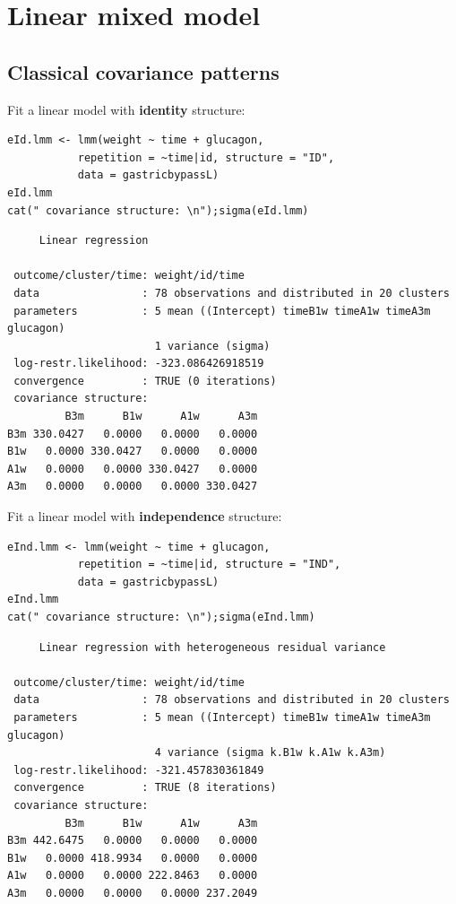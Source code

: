 \documentclass[12pt]{article}
\begin{document}
\clearpage

\section{Linear mixed model}
\label{sec:org724ba8b}
\subsection{Classical covariance patterns}
\label{sec:org7bb6bec}
Fit a linear model with \textbf{identity} structure:
\lstset{language=r,label= ,caption= ,captionpos=b,numbers=none}
\begin{lstlisting}
eId.lmm <- lmm(weight ~ time + glucagon,
	       repetition = ~time|id, structure = "ID",
	       data = gastricbypassL)
eId.lmm
cat(" covariance structure: \n");sigma(eId.lmm)
\end{lstlisting}

\begin{verbatim}
     Linear regression 

 outcome/cluster/time: weight/id/time 
 data                : 78 observations and distributed in 20 clusters 
 parameters          : 5 mean ((Intercept) timeB1w timeA1w timeA3m glucagon) 
                       1 variance (sigma) 
 log-restr.likelihood: -323.086426918519 
 convergence         : TRUE (0 iterations)
 covariance structure: 
         B3m      B1w      A1w      A3m
B3m 330.0427   0.0000   0.0000   0.0000
B1w   0.0000 330.0427   0.0000   0.0000
A1w   0.0000   0.0000 330.0427   0.0000
A3m   0.0000   0.0000   0.0000 330.0427
\end{verbatim}

Fit a linear model with \textbf{independence} structure:
\lstset{language=r,label= ,caption= ,captionpos=b,numbers=none}
\begin{lstlisting}
eInd.lmm <- lmm(weight ~ time + glucagon,
	       repetition = ~time|id, structure = "IND",
	       data = gastricbypassL)
eInd.lmm
cat(" covariance structure: \n");sigma(eInd.lmm)
\end{lstlisting}

\begin{verbatim}
     Linear regression with heterogeneous residual variance 

 outcome/cluster/time: weight/id/time 
 data                : 78 observations and distributed in 20 clusters 
 parameters          : 5 mean ((Intercept) timeB1w timeA1w timeA3m glucagon) 
                       4 variance (sigma k.B1w k.A1w k.A3m) 
 log-restr.likelihood: -321.457830361849 
 convergence         : TRUE (8 iterations)
 covariance structure: 
         B3m      B1w      A1w      A3m
B3m 442.6475   0.0000   0.0000   0.0000
B1w   0.0000 418.9934   0.0000   0.0000
A1w   0.0000   0.0000 222.8463   0.0000
A3m   0.0000   0.0000   0.0000 237.2049
\end{verbatim}
\end{document}
